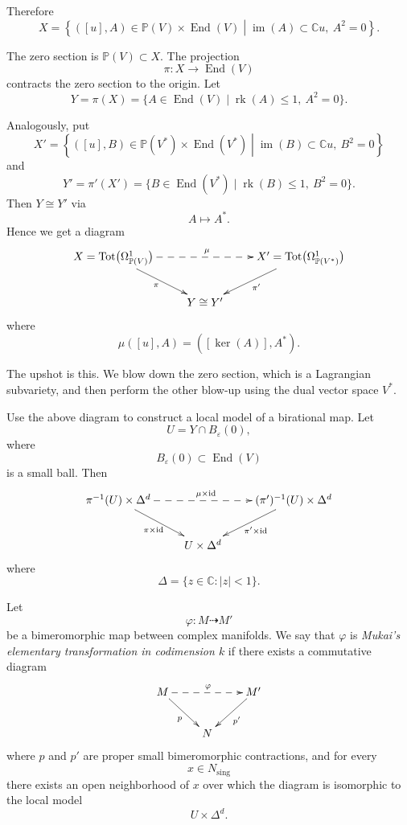 Therefore
\[
X=
\left\{
([u],A)\in
\mathbb{P}(V)\times
\operatorname{End}(V)
\middle|
\operatorname{im}(A)\subset
\mathbb{C}u,\ A^2=0
\right\}.
\]

The zero section is
$\mathbb{P}(V)\subset X$.
The projection
\[
\pi:X\to \operatorname{End}(V)
\]
contracts the zero section to the
origin.
Let
\[
Y=\pi(X)
=
\{A\in\operatorname{End}(V)
\mid
\operatorname{rk}(A)\leq 1,\ A^2=0\}.
\]

Analogously, put
\[
X'=
\left\{
([u],B)\in
\mathbb{P}(V^*)\times
\operatorname{End}(V^*)
\middle|
\operatorname{im}(B)\subset
\mathbb{C}u,\ B^2=0
\right\}
\]
and
\[
Y'=\pi'(X')
=
\{B\in\operatorname{End}(V^*)
\mid
\operatorname{rk}(B)\leq 1,\ B^2=0\}.
\]
Then $Y\cong Y'$ via
\[
A\mapsto A^*.
\]
Hence we get a diagram
\[
\xymatrix{
X=\operatorname{Tot}
\bigl(\Omega^1_{\mathbb{P}(V)}\bigr)
\ar@{-->}[rr]^{\mu}
\ar[dr]_{\pi}
&&
X'=\operatorname{Tot}
\bigl(\Omega^1_{\mathbb{P}(V^*)}\bigr)
\ar[dl]^{\pi'}
\\
& Y\cong Y' &
}
\]
where
\[
\mu([u],A)=([\ker(A)],A^*).
\]

The upshot is this.
We blow down the zero section, which
is a Lagrangian subvariety, and then
perform the other blow-up using the
dual vector space $V^*$.

Use the above diagram to construct a
local model of a birational map.
Let
\[
U=Y\cap B_\varepsilon(0),
\]
where
\[
B_\varepsilon(0)\subset
\operatorname{End}(V)
\]
is a small ball.
Then
\[
\xymatrix{
\pi^{-1}(U)\times\Delta^d
\ar@{-->}[rr]^{\mu\times\operatorname{id}}
\ar[dr]_{\pi\times\operatorname{id}}
&&
(\pi')^{-1}(U)\times\Delta^d
\ar[dl]^{\pi'\times\operatorname{id}}
\\
& U\times\Delta^d &
}
\]
where
\[
\Delta=\{z\in\mathbb{C}: |z|<1\}.
\]

\begin{definition}
\label{definition-let-m3}
Let
\[
\varphi:M\dashrightarrow M'
\]
be a bimeromorphic map between
complex manifolds.
We say that $\varphi$ is
{\it Mukai's elementary transformation
in codimension $k$} if there exists a
commutative diagram
\[
\xymatrix{
M \ar@{-->}[rr]^{\varphi}
\ar[dr]_{p}
&&
M' \ar[dl]^{p'}
\\
& N &
}
\]
where $p$ and $p'$ are proper small
bimeromorphic contractions, and for
every
\[
x\in N_{\mathrm{sing}}
\]
there exists an open neighborhood of
$x$ over which the diagram is
isomorphic to the local model
\[
U\times \Delta^d.
\]
\end{definition}

